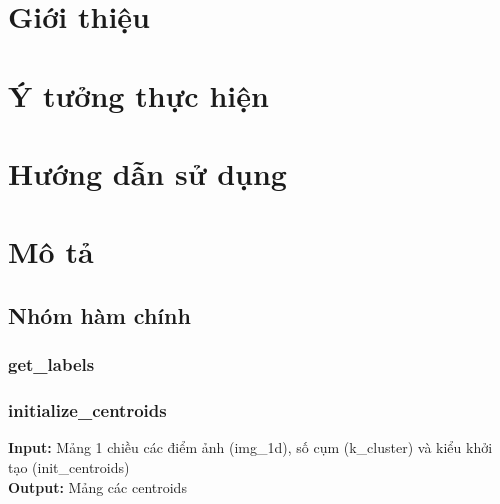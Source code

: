 \documentclass{article}
\begin{document}
\setlength{\parskip}{.5em}
\tableofcontents
\newpage

\setlength{\parskip}{.5em}
\newpage

%
\section{Giới thiệu}

\section{Ý tưởng thực hiện}

\section{Hướng dẫn sử dụng}

\section{Mô tả }
\subsection{Nhóm hàm chính}
\subsubsection{get\_labels}
\subsubsection{initialize\_centroids}
\textbf{Input:} Mảng 1 chiều các điểm ảnh (img\_1d), số cụm (k\_cluster) và kiểu khởi tạo (init\_centroids) \\
\textbf{Output:} Mảng các centroids
\end{document}
